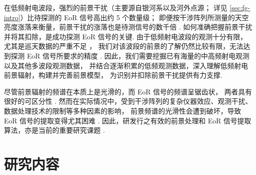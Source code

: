在低频射电波段，强烈的前景干扰（主要源自银河系以及河外点源；
详见 \autoref{sec:fg-intro}）比待探测的 EoR 信号高出约 5 个数量级；
即便按干涉阵列所测量的天空亮度涨落来衡量，前景干扰的涨落也是待测信号的数千倍
\cite{zaroubi2013}.
如何准确把握前景干扰并将其扣除，是成功探测 EoR 信号的关键.
由于低频射电波段的观测十分有限，尤其是巡天数据的严重不足
\cite{deOliveiraCosta2008,zheng2017gal}，
我们对该波段的前景的了解仍然比较有限，无法达到探测 EoR 信号所要求的精度
\cite{liu2012,harker2015,offringa2016,murray2017,procopio2017}.
因此，我们需要挖掘已有海量的中高频射电观测以及其他多波段观测数据，
并结合逐渐积累的低频观测数据，深入理解低频射电前景辐射，构建并完善前景模型，
为识别并扣除前景干扰提供有力支撑.

尽管前景辐射的频谱在本质上是光滑的，而 EoR 信号的频谱呈锯齿状，
两者具有很好的可区分性 \cite{wang2006,jelic2008,harker2009,wang2013}.
然而在实际情况中，受到干涉阵列的复杂仪器效应、观测干扰、
数据处理技术的限制等多种因素的影响，
前景频谱的光滑性会遭到破坏，导致 EoR 信号的提取变得尤其困难
\cite{liu2009ps,labropoulos2009,gehlot2018,mertens2018}.
因此，研发行之有效的前景处理和 EoR 信号提取算法，亦是当前的重要研究课题
\cite{chapman2016,pober2016,zhang2016,thyagarajan2018}.


\section{研究内容}

